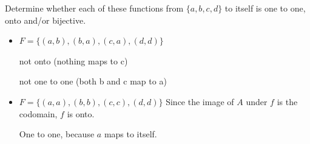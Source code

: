 \begin{exmp}
Determine whether each of these functions from $\{a,b,c,d\}$ to itself is one to one, onto and/or bijective.
\begin{itemize}
\item $F=\{(a,b), (b,a), (c,a),(d,d)\}$

not onto (nothing maps to c)

not one to one (both b and c map to a)
\item $F=\{(a,a), (b,b), (c,c),(d,d)\}$
Since the image of $A$ under $f$ is the codomain, $f$ is onto.

One to one, because $a$ maps to itself.



\end{itemize}
\end{exmp}

